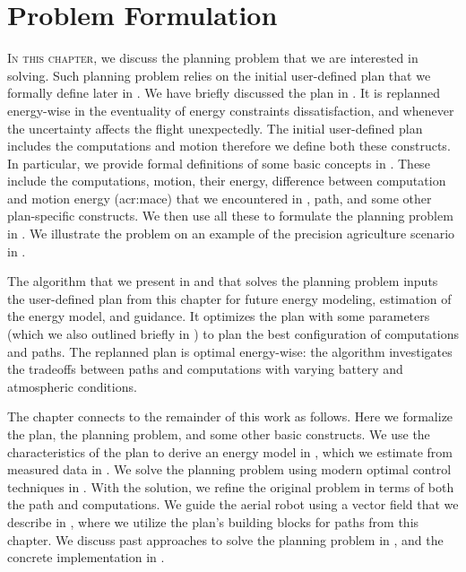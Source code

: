 
\chapter{Problem Formulation}
\label{cp:pb}

\lettrine{I}{n this chapter}, we discuss the planning problem that we are interested in solving. Such planning problem relies on the initial user-defined plan that we formally define later in . We have briefly discussed the plan in . It is replanned energy-wise in the eventuality of energy constraints dissatisfaction, and whenever the uncertainty affects the flight unexpectedly. The initial user-defined plan includes the computations and motion therefore we define both these constructs. In particular, we provide formal definitions of some basic concepts in . These include the computations, motion, their energy, difference between computation and motion energy (\Gls{acr:mace}) that we encountered in , path, and some other plan-specific constructs. We then use all these to formulate the planning problem in . We illustrate the problem on an example of the precision agriculture scenario in .

The algorithm that we present in  and that solves the planning problem inputs the user-defined plan from this chapter for future energy modeling, estimation of the energy model, and guidance. It optimizes the plan with some parameters (which we also outlined briefly in ) to plan the best configuration of computations and paths. The replanned plan is optimal energy-wise: the algorithm investigates the tradeoffs between paths and computations with varying battery and atmospheric conditions.

The chapter connects to the remainder of this work as follows. Here we formalize the plan, the planning problem, and some other basic constructs. We use the characteristics of the plan to derive an energy model in , which we estimate from measured data in . We solve the planning problem using modern optimal control techniques in . With the solution, we refine the original problem in terms of both the path and computations. We guide the aerial robot using a vector field that we describe in , where we utilize the plan's building blocks for paths from this chapter. We discuss past approaches to solve the planning problem in , and the concrete implementation in .


